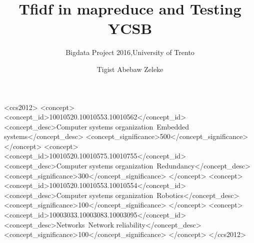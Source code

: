 \documentclass{bigdata}
\begin{document}
\title{Tfidf in mapreduce and Testing YCSB}
\subtitle{Bigdata Project 2016,University of Trento}
\author{
\alignauthor
Tigist Abebaw Zeleke\\
}
\maketitle
%
%
\begin{CCSXML}
<ccs2012>
 <concept>
  <concept_id>10010520.10010553.10010562</concept_id>
  <concept_desc>Computer systems organization~Embedded systems</concept_desc>
  <concept_significance>500</concept_significance>
 </concept>
 <concept>
  <concept_id>10010520.10010575.10010755</concept_id>
  <concept_desc>Computer systems organization~Redundancy</concept_desc>
  <concept_significance>300</concept_significance>
 </concept>
 <concept>
  <concept_id>10010520.10010553.10010554</concept_id>
  <concept_desc>Computer systems organization~Robotics</concept_desc>
  <concept_significance>100</concept_significance>
 </concept>
 <concept>
  <concept_id>10003033.10003083.10003095</concept_id>
  <concept_desc>Networks~Network reliability</concept_desc>
  <concept_significance>100</concept_significance>
 </concept>
</ccs2012>  
\end{CCSXML}

%
%
%
%
\end{document}
